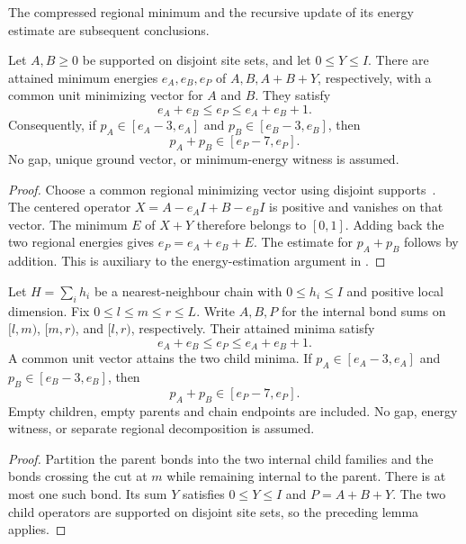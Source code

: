 The compressed regional minimum and the recursive update of its energy
estimate are subsequent conclusions.

\begin{lemma}
    \label{lem:disjoint_regional_energy_merge}
    \leanok
    Let $A,B\ge0$ be supported on disjoint site sets, and let
    $0\le Y\le I$. There are attained minimum energies $e_A,e_B,e_P$
    of $A,B,A+B+Y$, respectively, with a common unit minimizing vector
    for $A$ and $B$. They satisfy
    \[
        e_A+e_B\le e_P\le e_A+e_B+1.
    \]
    Consequently, if $p_A\in[e_A-3,e_A]$ and
    $p_B\in[e_B-3,e_B]$, then
    \[
        p_A+p_B\in[e_P-7,e_P].
    \]
    No gap, unique ground vector, or minimum-energy witness is assumed.
\end{lemma}
\begin{proof}\leanok
    Choose a common regional minimizing vector using disjoint
    supports~\cite[``One set of regional minima for every clipping'']{QICLean2026Blueprint}.
    The centered operator $X=A-e_AI+B-e_BI$ is positive and vanishes
    on that vector. The minimum $E$ of $X+Y$ therefore belongs to $[0,1]$.
    Adding back the two regional energies gives
    $e_P=e_A+e_B+E$. The estimate for $p_A+p_B$ follows by addition.
    This is auxiliary to the energy-estimation argument in
    \cite[Figure \texttt{fig:algo1}, lines 1627--1632]{Arad2016RigorousRG}.
\end{proof}

\begin{lemma}
    \label{lem:adjacent_interval_energy_merge}
    \leanok
    Let $H=\sum_i h_i$ be a nearest-neighbour chain with $0\le h_i\le I$
    and positive local dimension. Fix $0\le l\le m\le r\le L$.
    Write $A,B,P$ for the internal bond sums on $[l,m)$, $[m,r)$,
    and $[l,r)$, respectively. Their attained minima satisfy
    \[
        e_A+e_B\le e_P\le e_A+e_B+1.
    \]
    A common unit vector attains the two child minima. If
    $p_A\in[e_A-3,e_A]$ and $p_B\in[e_B-3,e_B]$, then
    \[
        p_A+p_B\in[e_P-7,e_P].
    \]
    Empty children, empty parents and chain endpoints are included.
    No gap, energy witness, or separate regional decomposition is assumed.
\end{lemma}
\begin{proof}\leanok
    Partition the parent bonds into the two internal child families and
    the bonds crossing the cut at $m$ while remaining internal to the parent.
    There is at most one such bond. Its sum $Y$ satisfies $0\le Y\le I$
    and $P=A+B+Y$. The two child operators are supported on disjoint site
    sets, so the preceding lemma applies.
\end{proof}
